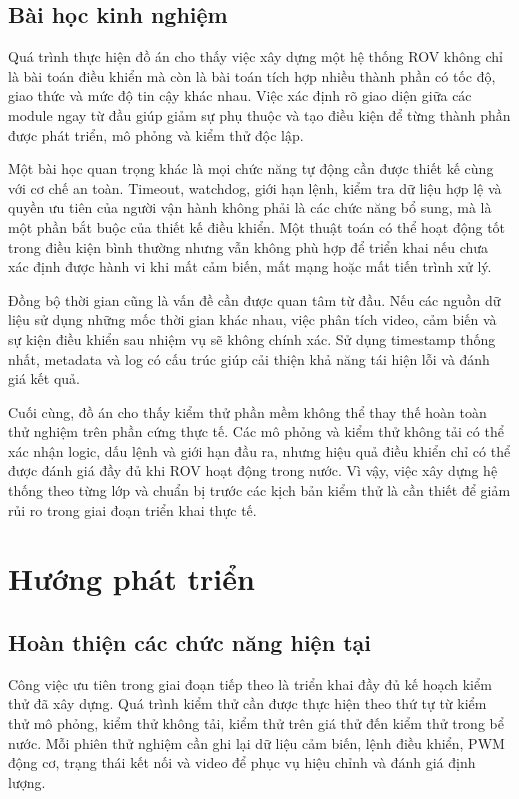 \documentclass[../DoAn.tex]{subfiles}
\begin{document}
\subsection{Bài học kinh nghiệm}

Quá trình thực hiện đồ án cho thấy việc xây dựng một hệ thống ROV không chỉ là bài toán điều khiển mà còn là bài toán tích hợp nhiều thành phần có tốc độ, giao thức và mức độ tin cậy khác nhau. Việc xác định rõ giao diện giữa các module ngay từ đầu giúp giảm sự phụ thuộc và tạo điều kiện để từng thành phần được phát triển, mô phỏng và kiểm thử độc lập.

Một bài học quan trọng khác là mọi chức năng tự động cần được thiết kế cùng với cơ chế an toàn. Timeout, watchdog, giới hạn lệnh, kiểm tra dữ liệu hợp lệ và quyền ưu tiên của người vận hành không phải là các chức năng bổ sung, mà là một phần bắt buộc của thiết kế điều khiển. Một thuật toán có thể hoạt động tốt trong điều kiện bình thường nhưng vẫn không phù hợp để triển khai nếu chưa xác định được hành vi khi mất cảm biến, mất mạng hoặc mất tiến trình xử lý.

Đồng bộ thời gian cũng là vấn đề cần được quan tâm từ đầu. Nếu các nguồn dữ liệu sử dụng những mốc thời gian khác nhau, việc phân tích video, cảm biến và sự kiện điều khiển sau nhiệm vụ sẽ không chính xác. Sử dụng timestamp thống nhất, metadata và log có cấu trúc giúp cải thiện khả năng tái hiện lỗi và đánh giá kết quả.

Cuối cùng, đồ án cho thấy kiểm thử phần mềm không thể thay thế hoàn toàn thử nghiệm trên phần cứng thực tế. Các mô phỏng và kiểm thử không tải có thể xác nhận logic, dấu lệnh và giới hạn đầu ra, nhưng hiệu quả điều khiển chỉ có thể được đánh giá đầy đủ khi ROV hoạt động trong nước. Vì vậy, việc xây dựng hệ thống theo từng lớp và chuẩn bị trước các kịch bản kiểm thử là cần thiết để giảm rủi ro trong giai đoạn triển khai thực tế.

\section{Hướng phát triển}

\subsection{Hoàn thiện các chức năng hiện tại}

Công việc ưu tiên trong giai đoạn tiếp theo là triển khai đầy đủ kế hoạch kiểm thử đã xây dựng. Quá trình kiểm thử cần được thực hiện theo thứ tự từ kiểm thử mô phỏng, kiểm thử không tải, kiểm thử trên giá thử đến kiểm thử trong bể nước. Mỗi phiên thử nghiệm cần ghi lại dữ liệu cảm biến, lệnh điều khiển, PWM động cơ, trạng thái kết nối và video để phục vụ hiệu chỉnh và đánh giá định lượng.
\end{document}
